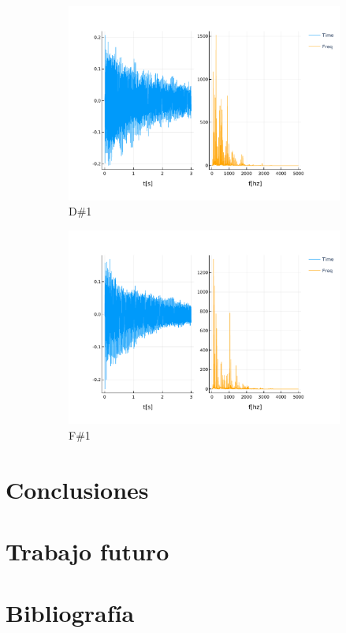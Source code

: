 \documentclass[12pt]{article}
\begin{document}
\begin{figure}[!ht]
	\centering
	\begin{subfigure}{.5\textwidth}
		\centering
		\includegraphics[width=1.0\linewidth]{assets/D1_sos.pdf}
		\caption{D\#1}
		\label{fig:d1_sos}
	\end{subfigure}%
	\begin{subfigure}{.5\textwidth}
		\centering
		\includegraphics[width=1.0\linewidth]{assets/F1_sos.pdf}
		\caption{F\#1}
		\label{fig:f1_sos}
	\end{subfigure}
	\caption{}
\end{figure}


\newpage
\section{Conclusiones}
\label{Conclusiones}

\section{Trabajo futuro}
\label{Trabajo futuro}

\section{Bibliografía}
\label{Bibliografía}
\printbibliography
\end{document}
